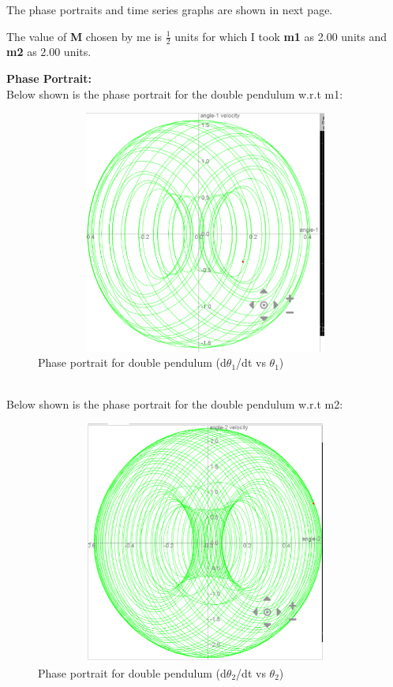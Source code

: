 \documentclass[11pt]{scrartcl} %
\begin{document}
The phase portraits and time series graphs are shown in next page.

The value of \textbf{M} chosen by me is $\frac{1}{2}$ units for which I took \textbf{m1} as 2.00 units and \textbf{m2} as 2.00 units.\newpage

\textbf{Phase Portrait:}\\
Below shown is the phase portrait for the double pendulum w.r.t m1:
\begin{figure}[h] %
	\centering
	\includegraphics[width=12cm, height=8cm]{Figures/M 4b l is 1.png} %
	\caption{Phase portrait for double pendulum (d$\theta_{1}$/dt vs $\theta_{1}$)}
\end{figure}
\\
Below shown is the phase portrait for the double pendulum w.r.t m2:
\begin{figure}[h] %
	\centering
	\includegraphics[width=12cm, height=8cm]{Figures/M 4b when l is 1.png} %
	\caption{Phase portrait for double pendulum (d$\theta_{2}$/dt vs $\theta_{2}$)}
\end{figure}
\end{document}
